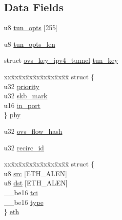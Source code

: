 \subsection*{Data Fields}
\begin{DoxyCompactItemize}
\item 
u8 \hyperlink{structsw__flow__key_a54b30752817dccb02665a7eecde52a72}{tun\+\_\+opts} \mbox{[}255\mbox{]}
\item 
u8 \hyperlink{structsw__flow__key_aef0ea317d3bd0125e0d6390261ba3e2d}{tun\+\_\+opts\+\_\+len}
\item 
struct \hyperlink{structovs__key__ipv4__tunnel}{ovs\+\_\+key\+\_\+ipv4\+\_\+tunnel} \hyperlink{structsw__flow__key_a2f87b7690c0cc2797f1f4347589472c3}{tun\+\_\+key}
\item 
\begin{tabbing}
xx\=xx\=xx\=xx\=xx\=xx\=xx\=xx\=xx\=\kill
struct \{\\
\>u32 \hyperlink{structsw__flow__key_a9dd898913d9faaec1ec970029e7fbb71}{priority}\\
\>u32 \hyperlink{structsw__flow__key_ae02571657f29397dcc45de8528f4ed05}{skb\_mark}\\
\>u16 \hyperlink{structsw__flow__key_a5848de18caa80d36d9bc60cc686a2c6e}{in\_port}\\
\} \hyperlink{structsw__flow__key_a57cbddb75a8d4fd859300bd34d98e84a}{phy}\\

\end{tabbing}\item 
u32 \hyperlink{structsw__flow__key_a73dd9402f1f54c321f6d704d9b018d15}{ovs\+\_\+flow\+\_\+hash}
\item 
u32 \hyperlink{structsw__flow__key_a7e51857c88ad6b0bf90551d0b6e2607b}{recirc\+\_\+id}
\item 
\begin{tabbing}
xx\=xx\=xx\=xx\=xx\=xx\=xx\=xx\=xx\=\kill
struct \{\\
\>u8 \hyperlink{structsw__flow__key_a2fbd4aa7a500630627eff0630f864117}{src} \mbox{[}ETH\_ALEN\mbox{]}\\
\>u8 \hyperlink{structsw__flow__key_a44a0cdfe7471df8bb73762085da4cda9}{dst} \mbox{[}ETH\_ALEN\mbox{]}\\
\>\_\_be16 \hyperlink{structsw__flow__key_a56b27b9b9eafa8f79acd544eba98c7b0}{tci}\\
\>\_\_be16 \hyperlink{structsw__flow__key_af30defbb2a81c997e8747594e1d937a0}{type}\\
\} \hyperlink{structsw__flow__key_af3e10c978a3a2bf303b7d953ac6ff361}{eth}\\


\end{tabbing}
\end{DoxyCompactItemize}
